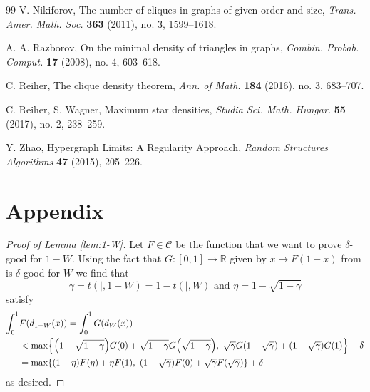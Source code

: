 \documentclass[11pt]{article}
\let\originalleft\left
\let\originalright\right
\renewcommand{\left}{\mathopen{}\mathclose\bgroup\originalleft}
\renewcommand{\right}{\aftergroup\egroup\originalright}
\theoremstyle{definition}
\newcommand{\paren}[1]{\left( #1 \right)}
\newcommand{\brac}[1]{\left\{ #1 \right\}}
\newcommand{\R}{\mathbb{R}}
\newcommand{\C}{\mathscr{C}}
\begin{document}
\begin{thebibliography}{99}
 V. Nikiforov, The number of cliques in graphs of given order and size, {\em Trans. Amer. Math. Soc.} \textbf{363} (2011), no. 3, 1599--1618.


 A. A. Razborov, On the minimal density of triangles in graphs, {\em Combin. Probab. Comput.} \textbf{17} (2008), no. 4,
603--618.

 C. Reiher,  The clique density theorem, {\em Ann. of Math.} \textbf{184} (2016), no. 3, 683--707.

 C. Reiher, S. Wagner,  Maximum star densities, {\em Studia Sci. Math. Hungar.} \textbf{55} (2017), no. 2, 238--259.



 Y. Zhao,  Hypergraph Limits: A Regularity Approach, {\em Random Structures Algorithms} \textbf{47} (2015), 205--226.
	
\end{thebibliography}

\section*{Appendix}


\begin{proof}[Proof of Lemma \ref{lem:1-W}]
    Let $F \in \C$ be the function that we want to prove $\delta$-good for $1 - W$. Using the fact that $G : [0,1] \to \R$ given by $x \mapsto F(1-x)$ from \cite[Lemma 3.1(ii)]{RW} is $\delta$-good for $W$ we find that \[\gamma = t (|, 1-W) = 1 - t (|, W) \text{ and } \eta = 1 - \sqrt{1 - \gamma}\] satisfy \begin{align*}
        \int_0^1 & F (d_{1-W} (x)) = \int_0^1 G (d_W (x)) \\
        &< \max \brac{ \paren{1 - \sqrt{1 - \gamma}} G (0) + \sqrt{1 - \gamma} G \paren{\sqrt{1 - \gamma}},~ \sqrt{\gamma} G(1 - \sqrt{\gamma}) + (1 - \sqrt{\gamma}) G(1) } + \delta \\
        &= \max \{ (1 - \eta) F(\eta) + \eta F(1),~ (1 - \sqrt{\gamma}) F (0) + \sqrt{\gamma} F (\sqrt{\gamma}) \} + \delta
    \end{align*} as desired.
\end{proof}
\end{document}
